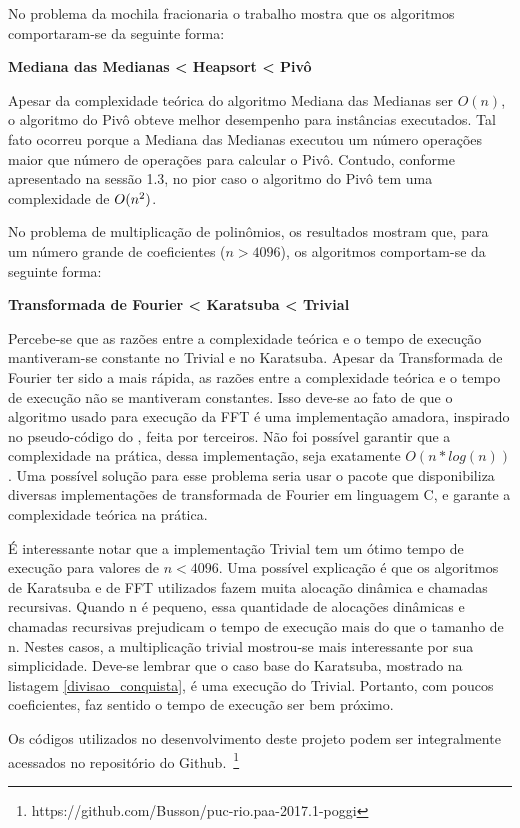 \documentclass[
	12pt,				%
	oneside,			%
	a4paper,			%
	english,			%
	french,				%
	spanish,			%
	brazil,				%
	]{abntex2}
\begin{document}
No problema da mochila fracionaria o trabalho mostra que os algoritmos comportaram-se da seguinte forma:

\begin{center}
\textbf{Mediana das Medianas < Heapsort < Pivô}
\end{center}
Apesar da complexidade teórica do algoritmo Mediana das Medianas ser $O(n)$, o algoritmo do Pivô obteve melhor desempenho para instâncias executados. Tal fato ocorreu porque a Mediana das Medianas executou um número operações maior que número de operações para calcular o Pivô. Contudo, conforme apresentado na sessão 1.3, no pior caso o algoritmo do Pivô tem uma complexidade de $O(n\textsuperscript{2})$.

No problema de multiplicação de polinômios, os resultados mostram que, para um número grande de coeficientes ($n > 4096$), os algoritmos comportam-se da seguinte forma:
\begin{center}
\textbf{Transformada de Fourier < Karatsuba < Trivial}
\end{center}
Percebe-se que as razões entre a complexidade teórica e o tempo de execução mantiveram-se constante no Trivial e no Karatsuba. Apesar da Transformada de Fourier ter sido a mais rápida, as razões entre a complexidade teórica e o tempo de execução não se mantiveram constantes. Isso deve-se ao fato de que o algoritmo usado para execução da FFT é uma implementação amadora, inspirado no pseudo-código do \cite{cormen2009}, feita por terceiros. Não foi possível garantir que a complexidade na prática, dessa implementação, seja exatamente $O(n*log(n))$. Uma possível solução para esse problema seria usar o pacote \cite{fftw} que disponibiliza diversas implementações de transformada de Fourier em linguagem C, e garante a complexidade teórica na prática.

É interessante notar que a implementação Trivial tem um ótimo tempo de execução para valores de $n < 4096$. Uma possível explicação é que os algoritmos de Karatsuba e de FFT utilizados fazem muita alocação dinâmica e chamadas recursivas. Quando n é pequeno, essa quantidade de alocações dinâmicas e chamadas recursivas prejudicam o tempo de execução mais do que o tamanho de n. Nestes casos, a multiplicação trivial mostrou-se mais interessante por sua simplicidade. Deve-se lembrar que o caso base do Karatsuba, mostrado na listagem \ref{divisao_conquista}, é uma execução do Trivial. Portanto, com poucos coeficientes, faz sentido o tempo de execução ser bem próximo.

Os códigos utilizados no desenvolvimento deste projeto podem ser integralmente acessados no repositório do Github.~\footnote{https://github.com/Busson/puc-rio.paa-2017.1-poggi}
\end{document}
